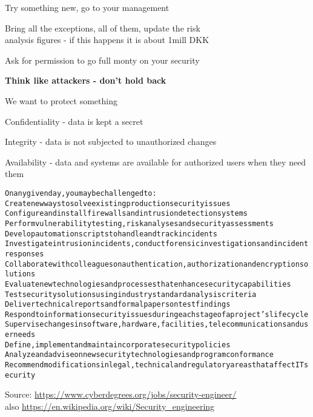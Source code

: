 \documentclass[Screen16to9,17pt]{foils}
\begin{document}
Try something new, go to your management

Bring all the exceptions, all of them, update the risk \\
analysis figures - if this happens it is about 1mill DKK

Ask for permission to go full monty on your security

{\bf Think like attackers - don't hold back}




\begin{list1}
\item We want to protect something
\item Confidentiality - data is kept a secret
\item Integrity - data is not subjected to unauthorized changes
\item Availability - data and systems are available for authorized users when they need them
\end{list1}


\begin{alltt}\small
On any given day, you may be challenged to:
        Create new ways to solve existing production security issues
        Configure and install firewalls and intrusion detection systems
        Perform vulnerability testing, risk analyses and security assessments
        Develop automation scripts to handle and track incidents
        Investigate intrusion incidents, conduct forensic investigations and incident responses
        Collaborate with colleagues on authentication, authorization and encryption solutions
        Evaluate new technologies and processes that enhance security capabilities
        Test security solutions using industry standard analysis criteria
        Deliver technical reports and formal papers on test findings
        Respond to information security issues during each stage of a project’s lifecycle
        Supervise changes in software, hardware, facilities, telecommunications and user needs
        Define, implement and maintain corporate security policies
        Analyze and advise on new security technologies and program conformance
        Recommend modifications in legal, technical and regulatory areas that affect IT security
\end{alltt}

Source: \url{https://www.cyberdegrees.org/jobs/security-engineer/}\\
also
\url{https://en.wikipedia.org/wiki/Security_engineering}
\end{document}
